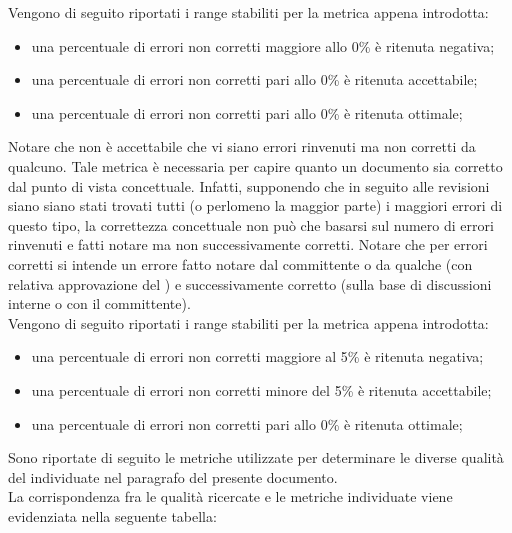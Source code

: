 					Vengono di seguito riportati i range stabiliti per la metrica appena introdotta:
					\begin{itemize}
						\item una percentuale di errori non corretti maggiore allo 0\% è ritenuta negativa;
						\item una percentuale di errori non corretti pari allo 0\% è ritenuta accettabile;
						\item una percentuale di errori non corretti pari allo 0\% è ritenuta ottimale;
					\end{itemize}
					Notare che non è accettabile che vi siano errori rinvenuti ma non corretti da qualcuno.
				 \label{subsec:erroriConcettuali}
					Tale metrica è necessaria per capire quanto un documento sia corretto dal punto di vista concettuale. Infatti, supponendo che in seguito alle revisioni siano siano stati trovati tutti (o perlomeno la maggior parte) i maggiori errori di questo tipo, la correttezza concettuale non può che basarsi sul numero di errori rinvenuti e fatti notare ma non successivamente corretti. Notare che per errori corretti si intende un errore fatto notare dal committente o da qualche  (con relativa approvazione del ) e successivamente corretto (sulla base di discussioni interne o con il committente).\\
					Vengono di seguito riportati i range stabiliti per la metrica appena introdotta:
					\begin{itemize}
						\item una percentuale di errori non corretti maggiore al 5\% è ritenuta negativa;
						\item una percentuale di errori non corretti minore del 5\% è ritenuta accettabile;
						\item una percentuale di errori non corretti pari allo 0\% è ritenuta ottimale;
					\end{itemize}
			Sono riportate di seguito le metriche utilizzate per determinare le diverse qualità del  individuate nel paragrafo  del presente documento.
			\\La corrispondenza fra le qualità ricercate e le metriche individuate viene evidenziata nella seguente tabella:\\
